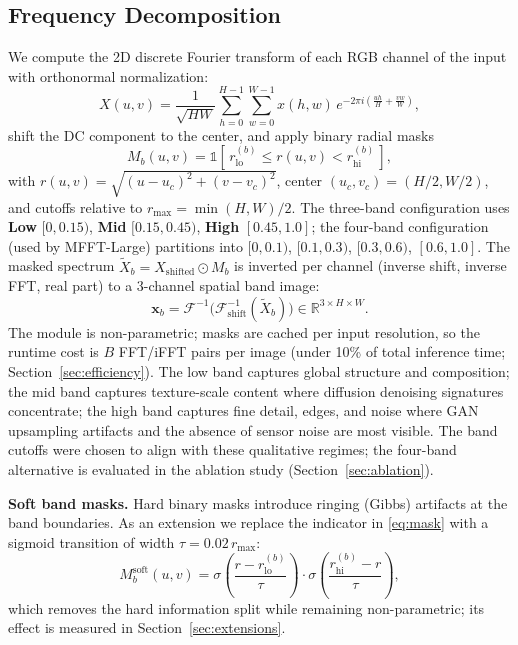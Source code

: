 \documentclass[journal]{IEEEtran}
\begin{document}
\subsection{Frequency Decomposition}
\label{sec:decomp}
We compute the 2D discrete Fourier transform of each RGB channel of the input with orthonormal normalization:
\begin{equation}
X(u,v) = \frac{1}{\sqrt{HW}}\sum_{h=0}^{H-1} \sum_{w=0}^{W-1} x(h,w)\, e^{-2\pi i \left(\frac{uh}{H} + \frac{vw}{W}\right)},
\label{eq:dft}
\end{equation}
shift the DC component to the center, and apply binary radial masks
\begin{equation}
M_b(u,v) = \mathbb{1}\!\left[\, r_{\mathrm{lo}}^{(b)} \le r(u,v) < r_{\mathrm{hi}}^{(b)} \,\right],
\label{eq:mask}
\end{equation}
with $r(u,v) = \sqrt{(u-u_c)^2 + (v-v_c)^2}$, center $(u_c, v_c) = (H/2, W/2)$, and cutoffs relative to $r_{\max}=\min(H,W)/2$. The three-band configuration uses \textbf{Low} $[0, 0.15)$, \textbf{Mid} $[0.15, 0.45)$, \textbf{High} $[0.45, 1.0]$; the four-band configuration (used by MFFT-Large) partitions into $[0,0.1)$, $[0.1,0.3)$, $[0.3,0.6)$, $[0.6,1.0]$. The masked spectrum $\tilde{X}_b = X_{\mathrm{shifted}} \odot M_b$ is inverted per channel (inverse shift, inverse FFT, real part) to a 3-channel spatial band image:
\begin{equation}
\mathbf{x}_b = \mathcal{F}^{-1}\!\big(\mathcal{F}_{\mathrm{shift}}^{-1}(\tilde{X}_b)\big) \in \mathbb{R}^{3 \times H \times W}.
\label{eq:ifft}
\end{equation}
The module is non-parametric; masks are cached per input resolution, so the runtime cost is $B$ FFT/iFFT pairs per image (under 10\% of total inference time; Section~\ref{sec:efficiency}). The low band captures global structure and composition; the mid band captures texture-scale content where diffusion denoising signatures concentrate; the high band captures fine detail, edges, and noise where GAN upsampling artifacts and the absence of sensor noise are most visible. The band cutoffs were chosen to align with these qualitative regimes; the four-band alternative is evaluated in the ablation study (Section~\ref{sec:ablation}).

\textbf{Soft band masks.} Hard binary masks introduce ringing (Gibbs) artifacts at the band boundaries. As an extension we replace the indicator in \eqref{eq:mask} with a sigmoid transition of width $\tau = 0.02\, r_{\max}$:
\begin{equation}
M_b^{\mathrm{soft}}(u,v) = \sigma\!\left(\frac{r - r_{\mathrm{lo}}^{(b)}}{\tau}\right) \cdot \sigma\!\left(\frac{r_{\mathrm{hi}}^{(b)} - r}{\tau}\right),
\label{eq:softmask}
\end{equation}
which removes the hard information split while remaining non-parametric; its effect is measured in Section~\ref{sec:extensions}.
\end{document}
